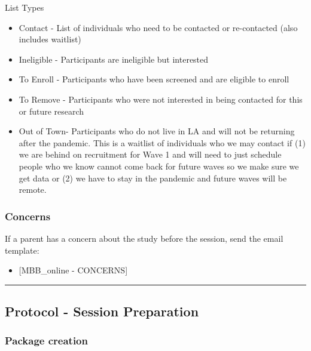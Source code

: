 \documentclass[]{book}
\providecommand{\tightlist}{%
  \setlength{\itemsep}{0pt}\setlength{\parskip}{0pt}}
\begin{document}
List Types

\begin{itemize}
\tightlist
\item
  Contact - List of individuals who need to be contacted or re-contacted (also includes waitlist)
\item
  Ineligible - Participants are ineligible but interested
\item
  To Enroll - Participants who have been screened and are eligible to enroll
\item
  To Remove - Participants who were not interested in being contacted for this or future research
\item
  Out of Town- Participants who do not live in LA and will not be returning after the pandemic. This is a waitlist of individuals who we may contact if (1) we are behind on recruitment for Wave 1 and will need to just schedule people who we know cannot come back for future waves so we make sure we get data or (2) we have to stay in the pandemic and future waves will be remote.
\end{itemize}

\hypertarget{concerns}{%
\subsubsection{Concerns}\label{concerns}}

If a parent has a concern about the study before the session, send the email template:

\begin{itemize}
\tightlist
\item
  {[}MBB\_online - CONCERNS{]}
\end{itemize}

\begin{center}\rule{0.5\linewidth}{0.5pt}\end{center}

\hypertarget{protocol---session-preparation}{%
\subsection{Protocol - Session Preparation}\label{protocol---session-preparation}}

\hypertarget{package-creation}{%
\subsubsection{Package creation}\label{package-creation}}
\end{document}
